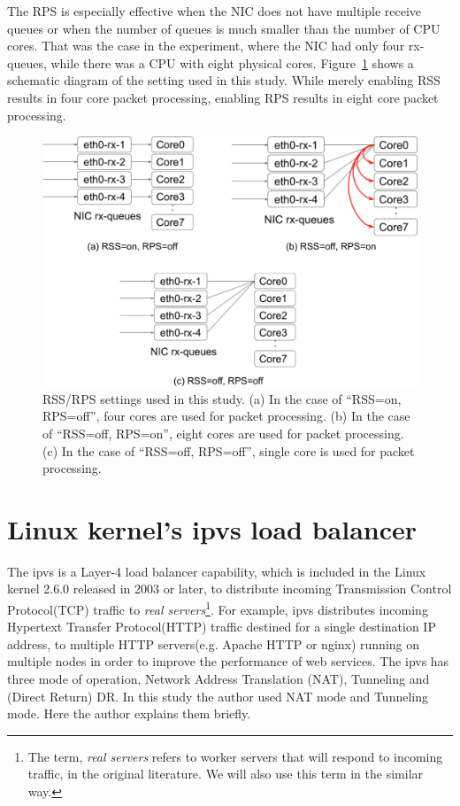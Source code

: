 The RPS is especially effective when the NIC does not have multiple receive queues or when the number of queues is 
much smaller than the number of CPU cores. 
That was the case in the experiment, where the NIC had only four rx-queues, 
while there was a CPU with eight physical cores.
Figure~\ref{Figs/rss-rps-none} shows a schematic diagram of the setting used in this study.
While merely enabling RSS results in four core packet processing, enabling RPS results in eight core packet processing.

\begin{figure}[h]
  \centering
  \includegraphics[width=0.8\columnwidth]{Figs/rss-rps-none}

  \par\bigskip
  \centering
  \begin{minipage}{0.9\columnwidth}
    \caption[RSS/RPS settings]{
      RSS/RPS settings used in this study.
      (a) In the case of \enquote{RSS=on, RPS=off}, four cores are used for packet processing.
      (b) In the case of \enquote{RSS=off, RPS=on}, eight cores are used for packet processing.
      (c) In the case of \enquote{RSS=off, RPS=off}, single core is used for packet processing.
    }
    \label{Figs/rss-rps-none}
  \end{minipage}
\end{figure}

\FloatBarrier

\section{Linux kernel's ipvs load balancer}

The ipvs is a Layer-4 load balancer capability, which is included in the Linux kernel 2.6.0 released in 2003 or later, 
to distribute incoming Transmission Control Protocol(TCP) traffic to 
{\em real servers}\footnote{The term, {\em real servers} refers to worker servers that will respond to incoming traffic, 
in the original literature\cite{Zhang2000}. We will also use this term in the similar way.}\cite{Zhang2000}. 
For example, ipvs distributes incoming Hypertext Transfer Protocol(HTTP) traffic destined for a single destination IP address, 
to multiple HTTP servers(e.g. Apache HTTP or nginx) running on multiple nodes in order to improve the performance of web services.
The ipvs has three mode of operation, Network Address Translation (NAT), Tunneling and (Direct Return) DR.
In this study the author used NAT mode and Tunneling mode.
Here the author explains them briefly.

